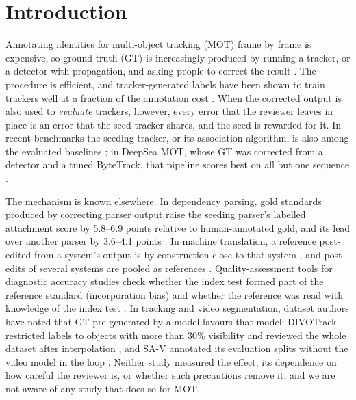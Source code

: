 \documentclass[final,times,twocolumn]{elsarticle}
\begin{document}
\section{Introduction}
\label{sec:intro}

Annotating identities for multi-object tracking (MOT) frame by frame is expensive, so ground truth (GT)
is increasingly produced by running a tracker, or a detector with propagation, and asking people to
correct the result \cite{hao2023divotrack,ravi2024sam2,nae2026indoorcrowd,fang2025calves}.
The procedure is efficient, and tracker-generated labels have been shown to train trackers well at a
fraction of the annotation cost \cite{cetintas2024spam}. When the corrected output is also used to
\emph{evaluate} trackers, however, every error that the reviewer leaves in place is an error that the
seed tracker shares, and the seed is rewarded for it. In recent benchmarks the seeding tracker, or its
association algorithm, is also among the evaluated baselines \cite{fang2025calves,nae2026indoorcrowd}; in
DeepSea MOT, whose GT was corrected from a detector and a tuned ByteTrack, that pipeline scores best on all
but one sequence \cite{barnard2025deepsea}.

The mechanism is known elsewhere. In dependency parsing, gold standards produced by correcting parser
output raise the seeding parser's labelled attachment score by 5.8--6.9 points relative to human-annotated
gold, and its lead over another parser by 3.6--4.1 points \cite{berzak2016anchoring}. In machine
translation, a reference post-edited from a system's output is by construction close to that system
\cite{snover2006hter}, and post-edits of several systems are pooled as references
\cite{bentivogli2018pe}. Quality-assessment tools for diagnostic accuracy studies check whether
the index test formed part of the reference standard (incorporation bias) and whether the reference was
read with knowledge of the index test \cite{whiting2003quadas,whiting2011quadas2}. In tracking and video
segmentation, dataset authors have noted that GT pre-generated by a model favours that model: DIVOTrack
restricted labels to objects with more than 30\% visibility and reviewed the whole dataset after
interpolation \cite{hao2023divotrack}, and SA-V annotated its evaluation splits without the video model in
the loop \cite{ravi2024sam2}. Neither study measured the effect, its dependence on how careful the reviewer
is, or whether such precautions remove it, and we are not aware of any study that does so for MOT.
\end{document}
